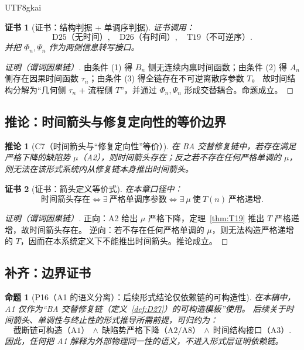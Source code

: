 \documentclass[12pt]{article}
\newtheorem{proposition}{命题}[section]
\newtheorem{corollary}{推论}[section]
\newtheorem{Certificate}{证书}[section]
\begin{document}
\begin{CJK*}{UTF8}{gkai}
\begin{Certificate}[证书：结构判据 + 单调序判据]
\label{cert:P10}
证书调用：
\[
\text{D25（无时间）},\quad
\text{D26（有时间）},\quad
\text{T19（不可逆序）}.
\]
并把 $\Phi_n,\Psi_n$ 作为两侧信息转写接口。
\end{Certificate}

\begin{proof}[证明（谓词因果链）]
由条件 (1) 得 $B_n$ 侧无连续内禀时间函数；由条件 (2) 得 $A_n$ 侧存在因果时间函数 $\tau_n$；由条件 (3) 得全链存在不可逆离散序参数 $T$。
故时间结构分解为“几何侧 $\tau_n$ + 流程侧 $T$”，并通过 $\Phi_n,\Psi_n$ 形成交替耦合。命题成立。
\end{proof}

\subsection{推论：时间箭头与修复定向性的等价边界}

\begin{corollary}[C7（时间箭头与“修复定向性”等价）]
\label{cor:C7}
在 BA 交替修复链中，若存在满足严格下降的缺陷势 $\mu$（A2），则时间箭头存在；反之若不存在任何严格单调的 $\mu$，则无法在该形式系统内从修复链本身推出时间箭头。
\end{corollary}

\begin{Certificate}[证书：箭头定义等价式]
\label{cert:C7}
在本章口径中：
\[
\text{时间箭头存在}
\Longleftrightarrow
\exists\ \text{严格单调序参数}
\Longleftrightarrow
\exists\ \mu\ \text{使}\ T(n)\ \text{严格递增}.
\]
\end{Certificate}

\begin{proof}[证明（谓词因果链）]
正向：A2 给出 $\mu$ 严格下降，定理~\ref{thm:T19} 推出 $T$ 严格递增，故时间箭头存在。
逆向：若不存在任何严格单调的 $\mu$，则无法构造严格递增的 $T$，因而在本系统定义下不能推出时间箭头。推论成立。
\end{proof}

\subsection{补齐：边界证书}

\begin{proposition}[P16（A1 的语义分离）：后续形式结论仅依赖链的可构造性]
\label{prop:P16}
在本稿中，A1 仅作为“BA 交替修复链（定义~\ref{def:D27}）的可构造模板”使用。
后续关于时间箭头、单调性与终止性的形式推导所需前提，可归约为：
\[
\text{截断链可构造（A1）}\ \wedge\ \text{缺陷势严格下降（A2/A8）}\ \wedge\ \text{时间结构接口（A3）}.
\]
因此，任何把 A1 解释为外部物理同一性的语义，不进入形式层证明依赖链。
\end{proposition}


\end{CJK*}
\end{document}
